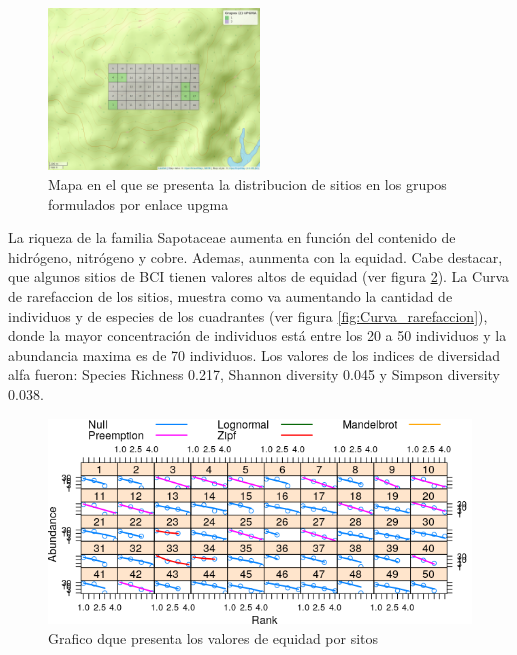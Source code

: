 \documentclass[11pt,]{article}
\begin{document}
\begin{figure}
\centering
\includegraphics[width=0.50000\textwidth]{mapa_upgma_k2.png}
\caption{Mapa en el que se presenta la distribucion de sitios en los
grupos formulados por enlace upgma\label{fig:mapa_upgma_k2}}
\end{figure}

La riqueza de la familia Sapotaceae aumenta en función del contenido de
hidrógeno, nitrógeno y cobre. Ademas, aunmenta con la equidad. Cabe
destacar, que algunos sitios de BCI tienen valores altos de equidad (ver
figura \ref{fig:grafico_niveles_equidad}). La Curva de rarefaccion de
los sitios, muestra como va aumentando la cantidad de individuos y de
especies de los cuadrantes (ver figura \ref{fig:Curva_rarefaccion}),
donde la mayor concentración de individuos está entre los 20 a 50
individuos y la abundancia maxima es de 70 individuos. Los valores de
los indices de diversidad alfa fueron: Species Richness 0.217, Shannon
diversity 0.045 y Simpson diversity 0.038.

\begin{figure}
\centering
\includegraphics{grafico_niveles_equidad.png}
\caption{Grafico dque presenta los valores de equidad por sitos
\label{fig:grafico_niveles_equidad}}
\end{figure}
\end{document}
